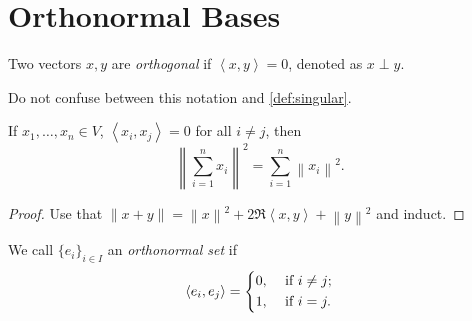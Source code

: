 \section{Orthonormal Bases}
\begin{definition}[Orthogonal]\label{def:orthogonal}
	Two vectors \(x, y\) are \emph{orthogonal} if \(\left< x,y \right> = 0\), denoted as \(x \perp y\).
\end{definition}
\begin{remark}
	Do not confuse between this notation and \autoref{def:singular}.
\end{remark}

\begin{lemma}\label{thm:Pythagorean-theorem}
	If \(x_1,\dots,x_n \in V\), \(\left< x_i,x_j \right> = 0\) for all \(i \neq j\), then
	\[
		\left\lVert \sum\limits_{i=1}^{n} x_{i} \right\rVert ^{2} = \sum\limits_{i=1}^{n} \left\lVert x_{i} \right\rVert ^{2}.
	\]
\end{lemma}
\begin{proof}
	Use that \(\left\lVert x + y\right\rVert =\left\lVert x\right\rVert^2 + 2\Re\left< x,y \right> + \left\lVert y\right\rVert^2\) and induct.
\end{proof}

\begin{definition}\label{def:orthonormal-set}
	We call \(\{e_i\}_{i \in I}\) an \emph{orthonormal set} if
	\[
		\left< e_i,e_j \right> = \begin{dcases}
			0, & \text{ if } i \neq j ; \\
			1, & \text{ if } i = j .
		\end{dcases}
	\]
\end{definition}